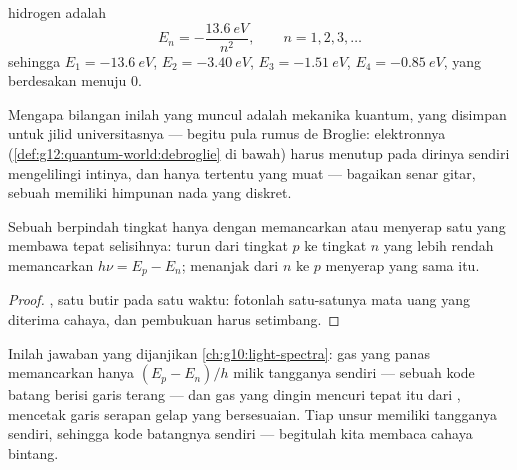 \begin{proposition}\label{prop:g12:quantum-world:hydrogen}
  hidrogen adalah
\[
E_n = -\frac{\qty{13.6}{eV}}{n^2}, \qquad n = 1, 2, 3, \dots
\]
sehingga $E_1 = \qty{-13.6}{eV}$, $E_2 = \qty{-3.40}{eV}$, $E_3 =
\qty{-1.51}{eV}$, $E_4 = \qty{-0.85}{eV}$, yang berdesakan menuju $0$.
\end{proposition}
\admitted

\begin{remark}\label{rem:g12:quantum-world:ladder-origin}
Mengapa bilangan inilah yang muncul adalah mekanika kuantum, yang disimpan untuk jilid universitasnya ---
begitu pula rumus de Broglie:  elektronnya
(\cref{def:g12:quantum-world:debroglie} di bawah) harus menutup pada dirinya sendiri mengelilingi
intinya, dan hanya  tertentu yang muat --- bagaikan senar gitar, sebuah
 memiliki himpunan nada yang diskret.
\end{remark}

\begin{theorem}\label{thm:g12:quantum-world:transition}
Sebuah  berpindah tingkat hanya dengan memancarkan atau menyerap satu  yang membawa
tepat selisihnya: turun dari tingkat $p$ ke tingkat $n$ yang lebih rendah memancarkan
$h\nu = E_p - E_n$; menanjak dari $n$ ke $p$ menyerap  yang sama itu.
\end{theorem}

\begin{proof}
, satu butir pada satu waktu: fotonlah satu-satunya mata uang
yang diterima cahaya, dan pembukuan  harus setimbang.
\end{proof}

\begin{remark}\label{rem:g12:quantum-world:lines}
Inilah jawaban yang dijanjikan \cref{ch:g10:light-spectra}: gas yang panas memancarkan
hanya  $(E_p - E_n)/h$ milik tangganya sendiri --- sebuah kode batang
berisi garis terang --- dan gas yang dingin mencuri tepat  itu dari , mencetak garis serapan gelap yang bersesuaian. Tiap unsur memiliki tangganya
sendiri, sehingga kode batangnya sendiri --- begitulah kita membaca cahaya bintang.
\end{remark}

